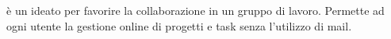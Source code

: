 


 è un  ideato per favorire la collaborazione in un gruppo di lavoro. Permette ad ogni utente la gestione online di progetti e task senza l'utilizzo di mail.